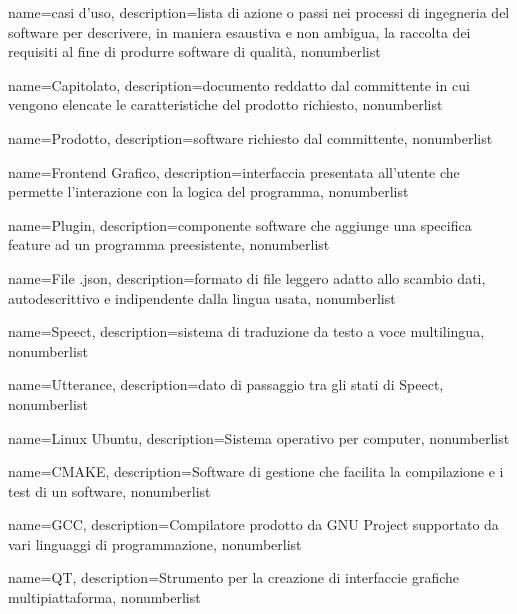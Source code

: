 {
	name={casi d'uso},
	description={lista di azione o passi nei processi di ingegneria del software per descrivere, in maniera esaustiva e non ambigua, la raccolta dei requisiti al fine di produrre software di qualità},
	nonumberlist
}


{
	name={Capitolato},
	description={documento reddatto dal committente in cui vengono elencate le caratteristiche del prodotto richiesto},
	nonumberlist
}

{
	name={Prodotto},
	description={software richiesto dal committente},
	nonumberlist
}

{
	name={Frontend Grafico},
	description={interfaccia presentata all'utente che permette l'interazione con la logica del programma},
	nonumberlist
}

{
	name={Plugin},
	description={componente software che aggiunge una specifica feature ad un programma preesistente},
	nonumberlist
}

{
	name={File .json},
	description={formato di file leggero adatto allo scambio dati, autodescrittivo e indipendente dalla lingua usata},
	nonumberlist
}

{
name={Speect},
description={sistema di traduzione da testo a voce multilingua},
nonumberlist
}

{
name={Utterance},
description={dato di passaggio tra gli stati di Speect},
nonumberlist
}



{
	name={Linux Ubuntu},
	description={Sistema operativo per computer},
	nonumberlist
}

{
	name={CMAKE},
	description={Software di gestione che facilita la compilazione e i test di un software},
	nonumberlist
}

{
	name={GCC},
	description={Compilatore prodotto da GNU Project supportato da vari linguaggi di programmazione},
	nonumberlist
}

{
	name={QT},
	description={Strumento per la creazione di interfaccie grafiche multipiattaforma},
	nonumberlist
}


